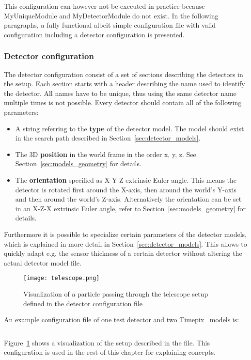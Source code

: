This configuration can however not be executed in practice because MyUniqueModule and MyDetectorModule do not exist.
In the following paragraphs, a fully functional albeit simple configuration file with valid configuration including a detector configuration is presented.

\subsubsection{Detector configuration}
\label{sec:detector_config}
The detector configuration consist of a set of sections describing the detectors in the setup.
Each section starts with a header describing the name used to identify the detector.
All names have to be unique, thus using the same detector name multiple times is not possible.
Every detector should contain all of the following parameters:
\begin{itemize}
\item A string referring to the \textbf{type} of the detector model.
The model should exist in the search path described in Section~\ref{sec:detector_models}.
\item The 3D \textbf{position} in the world frame in the order x, y, z.
See Section~\ref{sec:models_geometry} for details.
\item The \textbf{orientation} specified as X-Y-Z extrinsic Euler angle.
This means the detector is rotated first around the X-axis, then around the world's Y-axis and then around the world's Z-axis.
Alternatively the orientation can be set in an X-Z-X extrinsic Euler angle, refer to Section~\ref{sec:models_geometry} for details.
\end{itemize}
Furthermore it is possible to specialize certain parameters of the detector models, which is explained in more detail in Section~\ref{sec:detector_models}.
This allows to quickly adapt e.g. the sensor thickness of a certain detector without altering the actual detector model file.

\begin{figure}[t]
  \centering
  \texttt{[image: telescope.png]}
  \caption{Visualization of a particle passing through the telescope setup defined in the detector configuration file}
  \label{fig:telescope}
\end{figure}

An example configuration file of one test detector and two Timepix~\cite{timepix} models is:
\inputminted[frame=single,framesep=3pt,breaklines=true,tabsize=2,linenos]{ini}{../../etc/manual_detector.conf}
Figure~\ref{fig:telescope} shows a visualization of the setup described in the file.
This configuration is used in the rest of this chapter for explaining concepts.


